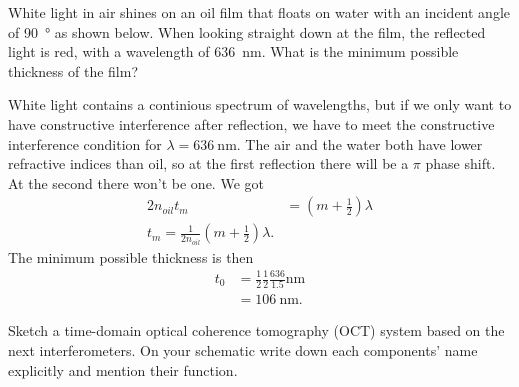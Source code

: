 \documentclass[answers, addpoints]{exam} %
\begin{document}
\begin{questions}
\question[10] White light in air shines on an oil film that floats on water with an incident angle of \SI{90}{\degree} as shown below.
When looking straight down at the film, the reflected light is red, with a wavelength of \SI{636}{\nano\meter}.
What is the minimum possible thickness of the film?
\begin{solution}
	White light contains a continious spectrum of wavelengths, but if we only want to have constructive interference after reflection, we have to meet the constructive interference condition for $\lambda=\SI{636}{\nano\meter}$.
	The air and the water both have lower refractive indices than oil, so at the first reflection there will be a $\pi$ phase shift.
	At the second there won't be one.
	We got
	\begin{align*}
		2 n_{oil} t_m &= \left(m+\frac{1}{2}\right)\lambda \\
		t_m = \frac{1}{2n_{oil}}\left(m+\frac{1}{2}\right)\lambda.
	\end{align*}
	The minimum possible thickness is then
	\begin{align*}
		t_0 &= \frac{1}{2}\frac{1}{2}\frac{636}{1.5}\si{\nano\meter} \\
		&= \SI{106}{\nano\meter}.
	\end{align*}
\end{solution}

\question[15] Sketch a time-domain optical coherence tomography (OCT) system based on the next interferometers.
On your schematic write down each components' name explicitly and mention their function.
\end{questions}
\end{document}
